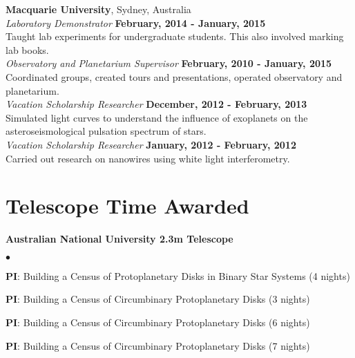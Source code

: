 \documentclass[margin,line]{res}
\newenvironment{list1}{
	\begin{list}{\ding{113}}{%
			\setlength{\itemsep}{0in}
			\setlength{\parsep}{0in} \setlength{\parskip}{0in}
			\setlength{\topsep}{0in} \setlength{\partopsep}{0in} 
			\setlength{\leftmargin}{0.17in}}}{\end{list}}
\newenvironment{list2}{
	\begin{list}{$\bullet$}{%
			\setlength{\itemsep}{0in}
			\setlength{\parsep}{0in} \setlength{\parskip}{0in}
			\setlength{\topsep}{0in} \setlength{\partopsep}{0in} 
			\setlength{\leftmargin}{0.2in}}}{\end{list}}
\begin{document}
\begin{resume}
		{\bf Macquarie University}, Sydney, Australia\\
		{\em Laboratory Demonstrator} \hfill {\bf February, 2014 - January, 2015}\\
		Taught lab experiments for undergraduate students. This also involved marking lab books.\\
		{\em Observatory and Planetarium Supervisor} \hfill {\bf February, 2010 - January, 2015}\\
		Coordinated groups, created tours and presentations, operated observatory and planetarium.\\
		{\em Vacation Scholarship Researcher} \hfill {\bf December, 2012 - February, 2013}\\
		Simulated light curves to understand the influence of exoplanets on the asteroseismological pulsation spectrum of stars.\\
		{\em Vacation Scholarship Researcher} \hfill {\bf January, 2012 - February, 2012}\\
		Carried out research on nanowires using white light interferometry.\\
		
		\section{\sc Telescope Time Awarded}
		\begin{list1}
			\item[] {\bf Australian National University 2.3m Telescope}
			\begin{list2}
				\item {\bf PI}: Building a Census of Protoplanetary Disks in Binary Star Systems (4 nights)
				\item {\bf PI}: Building a Census of Circumbinary Protoplanetary Disks (3 nights)
				\item {\bf PI}: Building a Census of Circumbinary Protoplanetary Disks (6 nights)
				\item {\bf PI}: Building a Census of Circumbinary Protoplanetary Disks (7 nights)
			\end{list2}
		\end{list1}
		

\end{resume}
\end{document}

